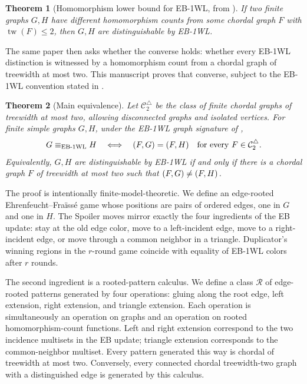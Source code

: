 \documentclass[11pt]{article}
\newtheorem{theorem}{Theorem}[section]
\let\hom\relax
\DeclareMathOperator{\hom}{hom}
\DeclareMathOperator{\tw}{tw}
\newcommand{\cC}{\mathcal{C}}
\newcommand{\cR}{\mathcal{R}}
\begin{document}
\begin{theorem}[Homomorphism lower bound for EB-1WL, from \cite{EBWL}]
\label{thm:original-lower-bound}
If two finite graphs $G,H$ have different homomorphism counts from some chordal graph $F$ with $\tw(F)\leq 2$, then $G,H$ are distinguishable by EB-1WL.
\end{theorem}

The same paper then asks whether the converse holds: whether every EB-1WL distinction is witnessed by a homomorphism count from a chordal graph of treewidth at most two.  This manuscript proves that converse, subject to the EB-1WL convention stated in .

\begin{theorem}[Main equivalence]
\label{thm:main-equivalence}
Let $\cC_2^\triangle$ be the class of finite chordal graphs of treewidth at most two, allowing disconnected graphs and isolated vertices.  For finite simple graphs $G,H$, under the EB-1WL graph signature of \cite{EBWL},
\[
G\equiv_{\mathrm{EB\text{-}1WL}} H
\quad\Longleftrightarrow\quad
\hom(F,G)=\hom(F,H)\quad\text{for every }F\in\cC_2^\triangle.
\]
Equivalently, $G,H$ are distinguishable by EB-1WL if and only if there is a chordal graph $F$ of treewidth at most two such that $\hom(F,G)\neq\hom(F,H)$.
\end{theorem}

The proof is intentionally finite-model-theoretic.  We define an edge-rooted Ehrenfeucht--Fra\"iss\'e game whose positions are pairs of ordered edges, one in $G$ and one in $H$.  The Spoiler moves mirror exactly the four ingredients of the EB update: stay at the old edge color, move to a left-incident edge, move to a right-incident edge, or move through a common neighbor in a triangle.  Duplicator's winning regions in the $r$-round game coincide with equality of EB-1WL colors after $r$ rounds.

The second ingredient is a rooted-pattern calculus.  We define a class $\cR$ of edge-rooted patterns generated by four operations: gluing along the root edge, left extension, right extension, and triangle extension.  Each operation is simultaneously an operation on graphs and an operation on rooted homomorphism-count functions.  Left and right extension correspond to the two incidence multisets in the EB update; triangle extension corresponds to the common-neighbor multiset.  Every pattern generated this way is chordal of treewidth at most two.  Conversely, every connected chordal treewidth-two graph with a distinguished edge is generated by this calculus.
\end{document}
